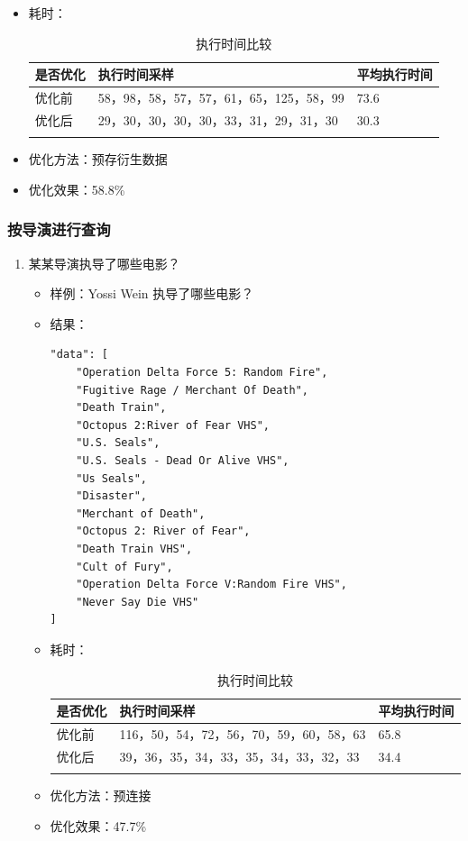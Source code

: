 \documentclass{ctexrep}
\begin{document}
\begin{enumerate}
\begin{itemize}
    	            \item 耗时：
    	                \begin{longtable}{l|p{5cm}|l}
    	                    \hline
    	                    是否优化 & 执行时间采样 & 平均执行时间\\
    	                    \hline
    	                    \hline
    	                    优化前 & 58，98，58，57，57，61，65，125，58，99 & 73.6\\
    	                    优化后 & 29，30，30，30，30，33，31，29，31，30 & 30.3\\
    	                    \hline
    	                    \caption{执行时间比较}
    	                \end{longtable}
    	            \item 优化方法：预存衍生数据
    	            \item 优化效果：58.8\%
    	        \end{itemize}
	    \end{enumerate}
	\subsubsection{按导演进行查询}
	    \begin{enumerate}
	        \item 某某导演执导了哪些电影？
    	        \begin{itemize}
    	            \item 样例：Yossi Wein 执导了哪些电影？
    	            \item 结果：
    	                \begin{lstlisting}
"data": [
    "Operation Delta Force 5: Random Fire",
    "Fugitive Rage / Merchant Of Death",
    "Death Train",
    "Octopus 2:River of Fear VHS",
    "U.S. Seals",
    "U.S. Seals - Dead Or Alive VHS",
    "Us Seals",
    "Disaster",
    "Merchant of Death",
    "Octopus 2: River of Fear",
    "Death Train VHS",
    "Cult of Fury",
    "Operation Delta Force V:Random Fire VHS",
    "Never Say Die VHS"
]
    	                \end{lstlisting}
    	            \item 耗时：
    	                \begin{longtable}{l|p{5cm}|l}
    	                    \hline
    	                    是否优化 & 执行时间采样 & 平均执行时间\\
    	                    \hline
    	                    \hline
    	                    优化前 & 116，50，54，72，56，70，59，60，58，63 & 65.8\\
    	                    优化后 & 39，36，35，34，33，35，34，33，32，33 & 34.4\\
    	                    \hline
    	                    \caption{执行时间比较}
    	                \end{longtable}
    	            \item 优化方法：预连接
    	            \item 优化效果：47.7\%
    	        \end{itemize}
	    \end{enumerate}
\end{document}
